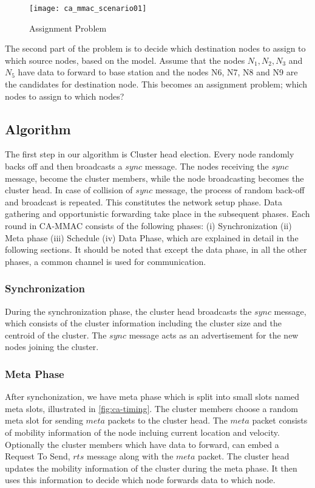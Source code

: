 \begin{figure}[h]{} 
  \begin{center}
		\texttt{[image: ca\_mmac\_scenario01]}
		\caption{Assignment Problem}
	\label{fig:scenario02}
  \end{center}
\end{figure}


The second part of the problem is to decide which destination nodes to assign to which source nodes, based on the model. Assume that the nodes $N_1, N_2, N_3$ and $N_5$ have data to forward to base station and the nodes N6, N7, N8 and N9 are the candidates for destination node. This becomes an assignment problem; which nodes to assign to which nodes?

\subsection{Algorithm}

The first step in our algorithm is Cluster head election. Every node randomly backs off and then broadcasts a $sync$ message. The nodes receiving the $sync$ message, become the cluster members, while the node broadcasting becomes the cluster head. In case of collision of $sync$ message, the process of random back-off and broadcast is repeated. This constitutes the network setup phase. Data gathering and opportunistic forwarding take place in the subsequent phases. Each round in CA-MMAC consists of the following phases: (i) Synchronization (ii) Meta phase (iii) Schedule (iv) Data Phase, which are explained in detail in the following sections. It should be noted that except the data phase, in all the other phases, a common channel is used for communication. 

\subsubsection{Synchronization}
During the synchronization phase, the cluster head broadcasts the $sync$ message, which consists of the cluster information including the cluster size and the centroid of the cluster.  The $sync$ message acts as an advertisement for the new nodes joining the cluster. 

\subsubsection{Meta Phase}
After synchonization, we have meta phase which is split into small slots named meta slots, illustrated in \ref{fig:ca-timing}. The cluster members choose a random meta slot for sending $meta$ packets to the cluster head. The $meta$ packet consists of mobility information of the node incluing current location and velocity. Optionally the cluster members which have data to forward, can embed a Request To Send, $rts$ message along with the $meta$ packet. The cluster head updates the mobility information of the cluster during the meta phase. It then uses this information to decide which node forwards data to which node.

